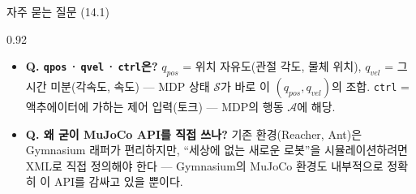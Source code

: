 \begin{frame}{자주 묻는 질문 (14.1)}
\begin{center}\begin{varwidth}{0.92\textwidth}
  \small
  \begin{itemize}
    \item \textbf{Q. \texttt{qpos}\,·\,\texttt{qvel}\,·\,\texttt{ctrl}은?}
      $q_{pos}$ = 위치 자유도(관절 각도, 물체 위치),
      $q_{vel}$ = 그 시간 미분(각속도, 속도) --- MDP 상태
      $\mathcal{S}$가 바로 이 $(q_{pos}, q_{vel})$의 조합.
      \texttt{ctrl} = 액추에이터에 가하는 제어 입력(토크) ---
      MDP의 행동 $\mathcal{A}$에 해당.
    \item \textbf{Q. 왜 굳이 MuJoCo API를 직접 쓰나?}
      기존 환경(Reacher, Ant)은 Gymnasium 래퍼가 편리하지만,
      ``세상에 없는 새로운 로봇''을 시뮬레이션하려면 XML로 직접
      정의해야 한다 --- Gymnasium의 MuJoCo 환경도 내부적으로
      정확히 이 API를 감싸고 있을 뿐이다.
  \end{itemize}
\end{varwidth}\end{center}
\end{frame}
